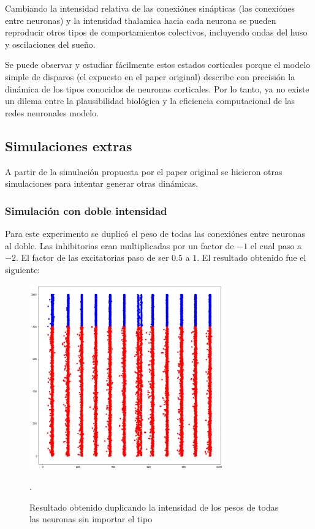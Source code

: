 \documentclass[12pt]{article}
\begin{document}
Cambiando la intensidad relativa de las conexiónes sinápticas (las conexiónes entre neuronas) y la intensidad thalamica hacia cada neurona se pueden reproducir otros tipos de comportamientos
colectivos, incluyendo ondas del huso y oscilaciones del sueño.

Se puede observar y estudiar fácilmente estos estados corticales porque el modelo simple de disparos (el expuesto en el paper original) describe con precisión la dinámica de los tipos conocidos
de neuronas corticales. Por lo tanto, ya no existe un dilema entre la plausibilidad biológica y la eficiencia computacional de las redes neuronales modelo.

\subsection{Simulaciones extras}
A partir de la simulación propuesta por el paper original se hicieron otras simulaciones para intentar generar otras dinámicas.

\subsubsection{Simulación con doble intensidad}
Para este experimento se duplicó el peso de todas las conexiónes entre neuronas al doble. Las inhibitorias eran multiplicadas por un factor de $-1$ el cual paso a $-2$.
El factor de las excitatorias paso de ser $0.5$ a $1$. El resultado obtenido fue el siguiente:

\begin{figure}[h!]
    \centering
        \includegraphics[height=8cm]{images/resultadoDobleAmbos.png}
    \caption[fontsize=2pt]{Resultado obtenido duplicando la intensidad de los pesos de todas las neuronas sin importar el tipo}.
\end{figure}
\end{document}
